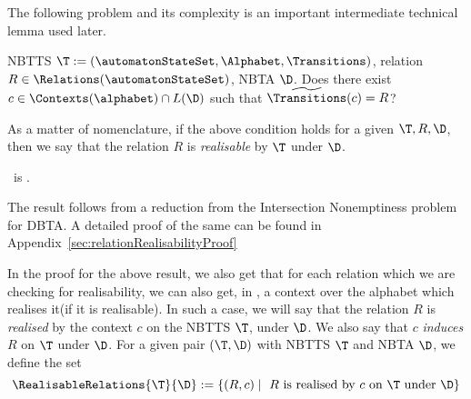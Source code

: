 The following problem and its complexity is an important intermediate technical lemma used later.

\probdef{\relationRealisabilityFull}{\relationRealisabilityShort}
{NBTTS $\T := (\automatonStateSet, \Alphabet, \Transitions)$, relation $R \in \Relations(\automatonStateSet)$, NBTA $\D$.}
{Does there exist $c \in \Contexts(\alphabet) \cap L(\D)$ such that $\widetilde{\Transitions}(c) = R$?}

As a matter of nomenclature, if the above condition holds for a given $\T, R, \D$, then we say that the relation $R$ is \emph{realisable} by $\T$ under $\D$.

\begin{theorem}\label{thm:relationRealisabilityExptc}
    \textsc{\relationRealisabilityFull}\ is \exptc.
\end{theorem}

The result follows from a reduction from the Intersection Nonemptiness problem for DBTA. A detailed proof of the same can be found in Appendix~\ref{sec:relationRealisabilityProof}

In the proof for the above result, we also get that for each relation which we are checking for realisability, we can also get, in \expt, a context over the alphabet which realises it(if it is realisable). In such a case, we will say that the relation $R$ is \emph{realised} by the context $c$ on the NBTTS $\T$, under $\D$. We also say that $c$ \emph{induces} $R$ on $\T$ under $\D$.  For a given pair $(\T, \D)$ with NBTTS $\T$ and NBTA $\D$, we define the set
\[ \RealisableRelations{\T}{\D} := \{(R, c) \mid \mbox{ $R$ is realised by $c$ on $\T$ under $\D$}\} \]